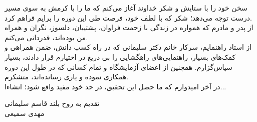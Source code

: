 \thispagestyle{empty}

{\nastaliq
سخن خود را با ستایش و شکر خداوند آغاز می‌کنم که ما را با کرمش به سوی مسیر درست توجه می‌دهد؛ شکر که با لطف خود، فرصت طی این دوره را برایم فراهم کرد.
\\
از پدر و مادرم که همواره در زندگی با زحمت فراوان، پشتیبان، دلسوز، نگران و همراه من بوده‌اند، قدردانی می‌کنم.
\\
از استاد راهنمایم، سرکار خانم دکتر سلیمانی که در راه کسب دانش، ضمن همراهی و کمک‌های بسیار، راهنمایی‌های راهگشایی را بی دریغ در اختیارم قرار دادند، بسیار سپاس‌گزارم.
همچنین از اعضای آزمایشگاه و تمام کسانی که در طول این دوره همکاری نموده و یاری رسانده‌اند، متشکرم.
\\
در آخر امیدوارم که ما حصل این تحقیق، در حد خود مفید واقع شود؛ انشاءا...

تقدیم به روح بلند قاسم سلیمانی
\\


\vspace{1cm}
مهدی سمیعی
}
\newpage\clearpage